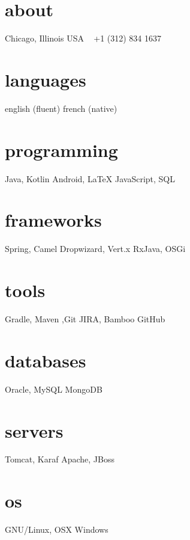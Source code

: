 \documentclass[]{friggeri-cv} %
\begin{document}



\begin{aside} %
\section{about}
{\color{darkgray}Chicago, Illinois
USA
~
+1 (312) 834 1637
~
\section{languages}
english (fluent)
french (native)
\section{programming}
Java, Kotlin
Android, \LaTeX
JavaScript, SQL
\section{frameworks}
Spring, Camel
Dropwizard, Vert.x
RxJava, OSGi
\section{tools}
Gradle, Maven ,Git
JIRA, Bamboo
GitHub
\section{databases}
Oracle, MySQL
MongoDB}
\section{servers}
Tomcat, Karaf 
Apache, JBoss
\section{os}
GNU/Linux, OSX
Windows
\end{aside}
\end{document}
